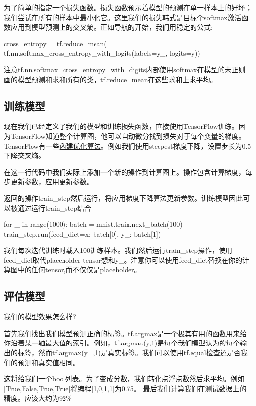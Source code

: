 为了简单的指定一个损失函数。损失函数预示着模型的预测在单一样本上的好坏；我们尝试在所有的样本中最小化它。这里我们的损失韩式是目标个softmax激活函数应用到模型预测上的交叉熵。正如导航的开始，我们用稳定的公式:
\begin{pythoncode}
cross_entropy = tf.reduce_mean(
    tf.nn.softmax_cross_entropy_with_logits(labels=y_, logits=y))
\end{pythoncode}
注意tf.nn.softmax\_cross\_entropy\_with\_digits内部使用softmax在模型的未正则画的模型预测和求和所有的类，tf.reduce\_mean在这些求和上求平均。
\subsection{训练模型}
现在我们已经定义了我们的模型和训练损失函数，直接使用TensorFlow训练。因为TensorFlow知道整个计算图，他可以自动微分找到损失对于每个变量的梯度。TensorFlow有一些\href{https://www.tensorflow.org/api_guides/python/train#optimizers}{內建优化算法}。例如我们使用steepest梯度下降，设置步长为0.5下降交叉熵。

在这一行代码中我们实际上添加一个新的操作到计算图上。操作包含计算梯度，每步更新参数，应用更新参数。

返回的操作train\_step然后运行，将应用梯度下降算法更新参数。训练模型因此可以被通过运行train\_step结合
\begin{pythoncode}
for _ in range(1000):
  batch = mnist.train.next_batch(100)
  train_step.run(feed_dict={x: batch[0], y_: batch[1]})
\end{pythoncode}
我们每次迭代训练时载入100训练样本。我们然后运行train\_step操作，使用feed\_dict取代placeholder tensor想和y\_。注意你可以使用feed\_dict替换在你的计算图中的任何tensor,而不仅仅是placeholder。
\subsection{评估模型}
我们的模型效果怎么样?

首先我们找出我们模型预测正确的标签。tf.argmax是一个极其有用的函数用来给你沿着某一轴最大值的索引。例如，tf.argmax(y,1)是每个我们模型认为的每个输出的标签，然而tf.argmax(y\_,1)是真实标签。我们可以使用tf.equal检查还是否我们的预测和真实值相同。\newline
{}

这将给我们一个bool列表。为了变成分数，我们转化点浮点数然后求平均。例如[True,False,True,True]将编程[1,0,1,1]为0.75。\newline
{}
最后我们计算我们在测试数据上的精度。应该大约为92\%


